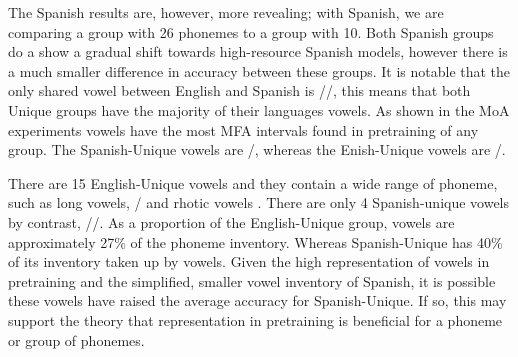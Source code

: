 The Spanish results are, however, more revealing; with Spanish, we are comparing a group with 26 phonemes to a group with 10. Both Spanish groups do a show a gradual shift towards high-resource Spanish models, however there is a much smaller difference in accuracy between these groups. It is notable that the only shared vowel between English and Spanish is //, this means that both Unique groups have the majority of their languages vowels. As shown in the MoA experiments vowels have the most MFA intervals found in pretraining of any group. The Spanish-Unique vowels are /, whereas the Enish-Unique vowels are /. 

There are 15 English-Unique vowels and they contain a wide range of phoneme, such as long vowels, / and rhotic vowels \textipa{\textrhookschwa, \textrhookrevepsilon}. There are only 4 Spanish-unique vowels by contrast, //. As a proportion of the English-Unique group, vowels are approximately 27\% of the phoneme inventory. Whereas Spanish-Unique has 40\% of its inventory taken up by vowels. Given the high representation of vowels in pretraining and the simplified, smaller vowel inventory of Spanish, it is possible these vowels have raised the average accuracy for Spanish-Unique. If so, this may support the theory that representation in pretraining is beneficial for a phoneme or group of phonemes.

